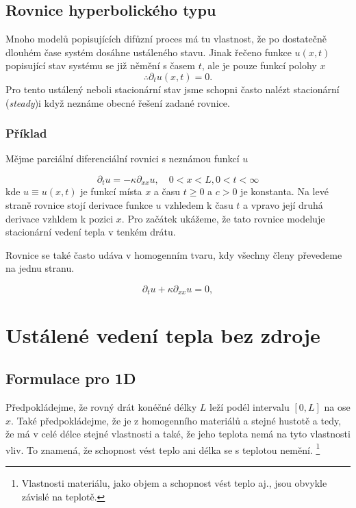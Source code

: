 \subsection{Rovnice hyperbolického typu}

Mnoho modelů popisujících difůzní proces má tu vlastnost, že po dostatečně dlouhém čase systém dosáhne ustáleného stavu. Jinak řečeno funkce $u(x, t)$ popisující stav systému se již němění s časem $t$, ale je pouze funkcí polohy $x$ $$ \therefore \partial_t u(x, t) = 0.$$ Pro tento ustálený neboli stacionární stav jsme schopni často nalézt stacionární (\textit{steady})i když neznáme obecné řešení zadané rovnice.   


\subsubsection{Příklad}

Mějme parciální diferenciální rovnici s neznámou funkcí $u$ 

\begin{equation}
    \partial_t u = -\kappa \partial_{xx} u, \quad 0 < x < L, 0 < t <  \infty
\end{equation}
kde $u \equiv u(x, t)$ je funkcí místa $x$ a času $t \ge 0$ a $c > 0$ je konstanta. Na levé straně rovnice stojí derivace funkce $u$ vzhledem k času $t$ a vpravo její druhá derivace vzhldem k pozici $x$. Pro začátek ukážeme, že tato rovnice modeluje stacionární vedení tepla v tenkém drátu. 

Rovnice se také často udáva v homogenním tvaru, kdy všechny členy převedeme na jednu stranu.

\begin{equation}
    \partial_t u + \kappa \partial_{xx} u    = 0,
\end{equation}

\section{Ustálené vedení tepla bez zdroje}

\subsection{Formulace pro 1D}
Předpokládejme, že rovný drát konéčné délky $L$ leží podél intervalu $[0, L]$ na ose $x$. Také předpokládejme, že je z homogenního materiálů a stejné hustotě a tedy, že má v celé délce stejné vlastnosti a také, že jeho teplota nemá na tyto vlastnosti vliv. To znamená, že schopnost vést teplo ani délka se s teplotou nemění. \footnote{ Vlastnosti materiálu, jako objem a schopnost vést teplo aj., jsou obvykle závislé na teplotě.}

